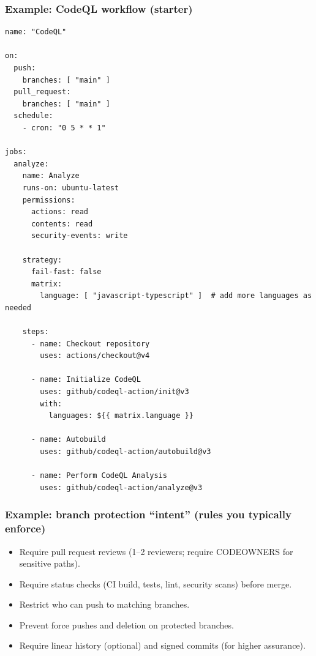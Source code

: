 \documentclass[11pt]{article}
\begin{document}
\subsubsection{Example: CodeQL workflow (starter)}
\begin{examplebox}[title={Example: \texttt{.github/workflows/codeql.yml} (starter)}]
\begin{verbatim}
name: "CodeQL"

on:
  push:
    branches: [ "main" ]
  pull_request:
    branches: [ "main" ]
  schedule:
    - cron: "0 5 * * 1"

jobs:
  analyze:
    name: Analyze
    runs-on: ubuntu-latest
    permissions:
      actions: read
      contents: read
      security-events: write

    strategy:
      fail-fast: false
      matrix:
        language: [ "javascript-typescript" ]  # add more languages as needed

    steps:
      - name: Checkout repository
        uses: actions/checkout@v4

      - name: Initialize CodeQL
        uses: github/codeql-action/init@v3
        with:
          languages: ${{ matrix.language }}

      - name: Autobuild
        uses: github/codeql-action/autobuild@v3

      - name: Perform CodeQL Analysis
        uses: github/codeql-action/analyze@v3
\end{verbatim}
\end{examplebox}

\subsubsection{Example: branch protection ``intent'' (rules you typically enforce)}
\begin{examplebox}[title={Branch protection intent checklist (translate into rulesets/branch protections)}]
\begin{itemize}[leftmargin=*,itemsep=2pt]
  \item Require pull request reviews (1--2 reviewers; require CODEOWNERS for sensitive paths).
  \item Require status checks (CI build, tests, lint, security scans) before merge.
  \item Restrict who can push to matching branches.
  \item Prevent force pushes and deletion on protected branches.
  \item Require linear history (optional) and signed commits (for higher assurance).
\end{itemize}
\end{examplebox}
\end{document}

